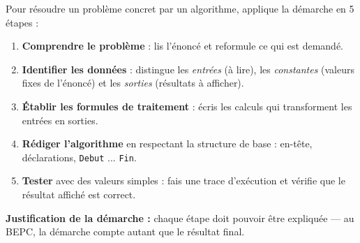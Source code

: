 \documentclass[11pt]{article}
\begin{document}
\begin{methode}
Pour résoudre un problème concret par un algorithme, applique la démarche en 5 étapes :
\begin{enumerate}
  \item \textbf{Comprendre le problème} : lis l'énoncé et reformule ce qui est demandé.
  \item \textbf{Identifier les données} : distingue les \emph{entrées} (à lire), les \emph{constantes} (valeurs fixes de l'énoncé) et les \emph{sorties} (résultats à afficher).
  \item \textbf{Établir les formules de traitement} : écris les calculs qui transforment les entrées en sorties.
  \item \textbf{Rédiger l'algorithme} en respectant la structure de base : en-tête, déclarations, \texttt{Debut} ... \texttt{Fin}.
  \item \textbf{Tester} avec des valeurs simples : fais une trace d'exécution et vérifie que le résultat affiché est correct.
\end{enumerate}
\textbf{Justification de la démarche :} chaque étape doit pouvoir être expliquée — au BEPC, la démarche compte autant que le résultat final.
\end{methode}
\end{document}
